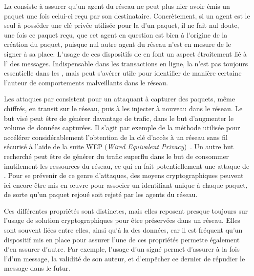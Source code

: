 La  consiste à assurer qu'un agent du réseau ne peut plus nier avoir émis un paquet une fois celui-ci reçu par son destinataire.
Concrètement, si un agent est le seul à posséder une clé privée utilisée pour la  d'un paquet, il ne fait nul doute, une fois ce paquet reçu, que cet agent en question est bien à l'origine de la création du paquet, puisque nul autre agent du réseau n'est en mesure de le signer à sa place.
L'usage de ces dispositifs de  en font un aspect étroitement lié à l' des messages.
Indispensable dans les transactions en ligne, la  n'est pas toujours essentielle dans les \rcs, mais peut s'avérer utile pour identifier de manière certaine l'auteur de comportements malveillants dans le réseau.

Les attaques par  consistent pour un attaquant à capturer des paquets, même chiffrés, en transit sur le réseau, puis à les injecter à nouveau dans le réseau.
Le but visé peut être de générer davantage de trafic, dans le but d'augmenter le volume de données capturées.
Il s'agit par exemple de la méthode utilisée pour accélérer considérablement l'obtention de la clé d'accès à un réseau sans fil sécurisé à l'aide de la suite WEP (\textit{Wired Equivalent Privacy})~\cite{BGW01}.
Un autre but recherché peut être de générer du trafic superflu dans le but de consommer inutilement les ressources du réseau, ce qui en fait potentiellement une attaque de \dds.
Pour se prévenir de ce genre d'attaques, des moyens cryptographiques peuvent ici encore être mis en œuvre pour associer un identifiant unique à chaque paquet, de sorte qu'un paquet rejoué soit rejeté par les agents du réseau.

Ces différentes propriétés sont distinctes, mais elles reposent presque toujours sur l'usage de solution cryptographiques pour être préservées dans un réseau.
Elles sont souvent liées entre elles, ainsi qu'à la  des données, car il est fréquent qu'un dispositif mis en place pour assurer l'une de ces propriétés permette également d'en assurer d'autre.
Par exemple, l'usage d'un  signé permet d'assurer à la fois l'\integrite d'un message, la validité de son auteur, et d'empêcher ce dernier de répudier le message dans le futur.


